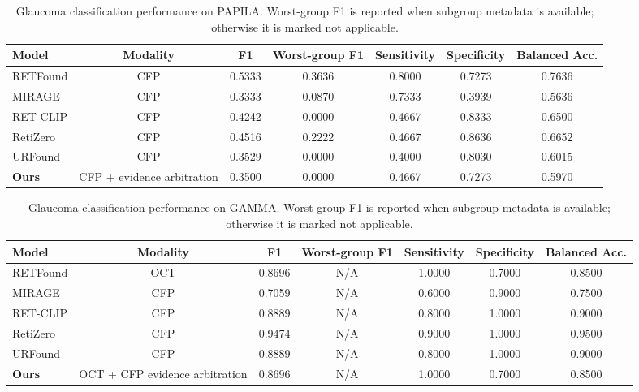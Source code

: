 \begin{table}[t]
\centering
\caption{Glaucoma classification performance on PAPILA. Worst-group F1 is reported when subgroup metadata is available; otherwise it is marked not applicable.}
\label{tab:glaucoma_papila}
\begin{tabular}{lcccccc}
\toprule
\textbf{Model} & \textbf{Modality} & \textbf{F1} & \textbf{Worst-group F1} & \textbf{Sensitivity} & \textbf{Specificity} & \textbf{Balanced Acc.} \\
\midrule
RETFound & CFP & 0.5333 & 0.3636 & 0.8000 & 0.7273 & 0.7636 \\
MIRAGE & CFP & 0.3333 & 0.0870 & 0.7333 & 0.3939 & 0.5636 \\
RET-CLIP & CFP & 0.4242 & 0.0000 & 0.4667 & 0.8333 & 0.6500 \\
RetiZero & CFP & 0.4516 & 0.2222 & 0.4667 & 0.8636 & 0.6652 \\
URFound & CFP & 0.3529 & 0.0000 & 0.4000 & 0.8030 & 0.6015 \\
\textbf{Ours} & CFP + evidence arbitration & 0.3500 & 0.0000 & 0.4667 & 0.7273 & 0.5970 \\
\bottomrule
\end{tabular}
\end{table}

\begin{table}[t]
\centering
\caption{Glaucoma classification performance on GAMMA. Worst-group F1 is reported when subgroup metadata is available; otherwise it is marked not applicable.}
\label{tab:glaucoma_gamma}
\begin{tabular}{lcccccc}
\toprule
\textbf{Model} & \textbf{Modality} & \textbf{F1} & \textbf{Worst-group F1} & \textbf{Sensitivity} & \textbf{Specificity} & \textbf{Balanced Acc.} \\
\midrule
RETFound & OCT & 0.8696 & N/A & 1.0000 & 0.7000 & 0.8500 \\
MIRAGE & CFP & 0.7059 & N/A & 0.6000 & 0.9000 & 0.7500 \\
RET-CLIP & CFP & 0.8889 & N/A & 0.8000 & 1.0000 & 0.9000 \\
RetiZero & CFP & 0.9474 & N/A & 0.9000 & 1.0000 & 0.9500 \\
URFound & CFP & 0.8889 & N/A & 0.8000 & 1.0000 & 0.9000 \\
\textbf{Ours} & OCT + CFP evidence arbitration & 0.8696 & N/A & 1.0000 & 0.7000 & 0.8500 \\
\bottomrule
\end{tabular}
\end{table}
